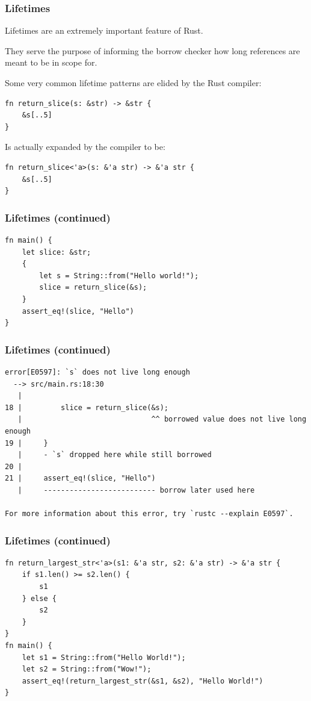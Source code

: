 \documentclass{slides}
\begin{document}
\begin{frame}[fragile]
\frametitle{Lifetimes}
Lifetimes are an extremely important feature of Rust.

They serve the purpose of informing the borrow checker how long references are meant to be in scope for.

Some very common lifetime patterns are elided by the Rust compiler:

\begin{verbatim}
fn return_slice(s: &str) -> &str {
    &s[..5]
}
\end{verbatim}
Is actually expanded by the compiler to be:
\begin{verbatim}
fn return_slice<'a>(s: &'a str) -> &'a str {
    &s[..5]
}
\end{verbatim}
\end{frame}

\begin{frame}[fragile]
\frametitle{Lifetimes (continued)}
\begin{verbatim}
fn main() {
    let slice: &str;
    {
        let s = String::from("Hello world!");
        slice = return_slice(&s);
    }
    assert_eq!(slice, "Hello")
}
\end{verbatim}
\end{frame}

\begin{frame}[fragile]
\frametitle{Lifetimes (continued)}
\begin{verbatim}
error[E0597]: `s` does not live long enough
  --> src/main.rs:18:30
   |
18 |         slice = return_slice(&s);
   |                              ^^ borrowed value does not live long enough
19 |     }
   |     - `s` dropped here while still borrowed
20 |     
21 |     assert_eq!(slice, "Hello")
   |     -------------------------- borrow later used here

For more information about this error, try `rustc --explain E0597`.
\end{verbatim}
\end{frame}

\begin{frame}[fragile]
\frametitle{Lifetimes (continued)}
\begin{verbatim}
fn return_largest_str<'a>(s1: &'a str, s2: &'a str) -> &'a str {
    if s1.len() >= s2.len() {
        s1
    } else {
        s2
    }
}
fn main() {
    let s1 = String::from("Hello World!");
    let s2 = String::from("Wow!");
    assert_eq!(return_largest_str(&s1, &s2), "Hello World!")
}
\end{verbatim}
\end{frame}
\end{document}
